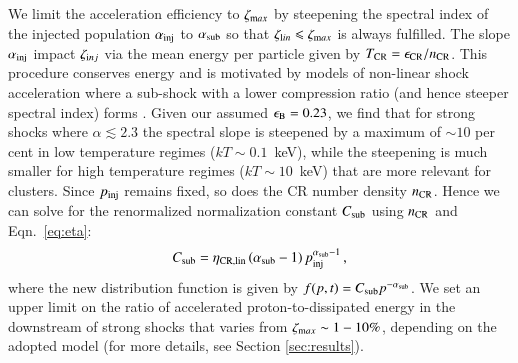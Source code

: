 \documentclass[a4paper,fleqn,usenatbib]{mnras}
\newcommand\eb{\epsilon_\rmn{B}}
\begin{document}
We limit the acceleration efficiency to $\zeta_{{\mathrm{m}}ax}$ by
steepening the spectral index of the injected population
$\alpha_{\mathrm{inj}}$ to $\alpha_{\mathrm{sub}}$ so that $\zeta_{{\mathrm{l}}in}
\leqslant \zeta_{{\mathrm{m}}ax}$ is always fulfilled. The slope
$\alpha_{\mathrm{inj}}$ impact $\zeta_{{\mathrm{i}}nj}$ via the mean energy per
particle given by $T_{\mathrm{CR}} = \epsilon_{\mathrm{CR}}/n_{\mathrm{CR}}$. This
procedure conserves energy and is motivated by models of non-linear
shock acceleration where a sub-shock with a lower compression ratio
(and hence steeper spectral index) forms
\citep[e.g.,][]{2000ApJ...540..292E}. Given our assumed $\eb=0.23$, we
find that for strong shocks where $\alpha \lesssim 2.3$ the spectral
slope is steepened by a maximum of $\sim 10$ per cent in low
temperature regimes ($kT\sim 0.1$~keV), while the steepening is much
smaller for high temperature regimes ($kT\sim 10$~keV) that are more
relevant for clusters. Since $p_{\rm inj}$ remains fixed, so does the
CR number density $n_{\mathrm{CR}}$. Hence we can solve for the
renormalized normalization constant $C_{\mathrm{sub}}$ using $n_{\mathrm{CR}}$
and Eqn.~\ref{eq:eta}:
\begin{equation}
  \label{eq:Cp_sub}
  C_{\mathrm{sub}}=\eta_{\mathrm{CR,lin}}\,(\alpha_{\mathrm{sub}}-1)\,p_{\mathrm{inj}}^{\alpha_{\mathrm{sub}}-1}\,,
\end{equation}
where the new distribution function is given by $f(p,t)= C_{\mathrm{sub}}
p^{-\alpha_{\mathrm{sub}}}$. We set an upper limit on the ratio of
accelerated proton-to-dissipated energy in the downstream of strong
shocks that varies from $\zeta_{{\mathrm{m}}ax} \sim 1-10\%$, depending on
the adopted model (for more details, see Section \ref{sec:results}).
\end{document}
